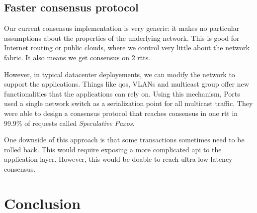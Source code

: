 \section{Faster consensus protocol}

Our current consensus implementation is very generic: it makes no particular assumptions about the properties of the underlying network.
This is good for Internet routing or public clouds, where we control very little about the network fabric.
It also means we get consensus on 2 \glspl{rtt}.

However, in typical datacenter deployements, we can modify the network to support the applications.
Things like \gls{qos}, VLANs and multicast group offer new functionalities that the applications can rely on.
Using this mechanism, Ports \etal used a single network switch as a serialization point for all multicast traffic.
They were able to design a consensus protocol that reaches consensus in one \gls{rtt} in 99.9\% of requests called \emph{Speculative Paxos}\cite{specpaxos}.

One downside of this approach is that some transactions sometimes need to be rolled back.
This would require exposing a more complicated \gls{api} to the application layer.
However, this would be doable to reach ultra low latency consensus.

\chapter{Conclusion}

